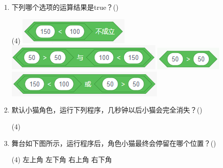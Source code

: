 \documentclass[10pt, a4paper]{article}
\newcommand{\hq}{\hfill(\qquad)}
\begin{document}
\begin{enumerate}
        \newpage
        \item 下列哪个选项的运算结果是true？\hq
        \begin{tasks}(4)
            \task \includegraphics[width=.14\textwidth]{figure/16a.png}
            \task \includegraphics[width=.18\textwidth]{figure/16b.png}
            \task \includegraphics[width=.1\textwidth]{figure/16c.png}
            \task \includegraphics[width=.18\textwidth]{figure/16d.png}
        \end{tasks}

        \item 默认小猫角色，运行下列程序，几秒钟以后小猫会完全消失？\hq
        \begin{tasks}(4)
        \end{tasks}

        \item 舞台如下图所示，运行程序后，角色小猫最终会停留在哪个位置？\hq
        \begin{tasks}(4)
            \task 左上角
            \task 左下角
            \task 右上角
            \task 右下角
        \end{tasks}


\end{enumerate}
\end{document}
